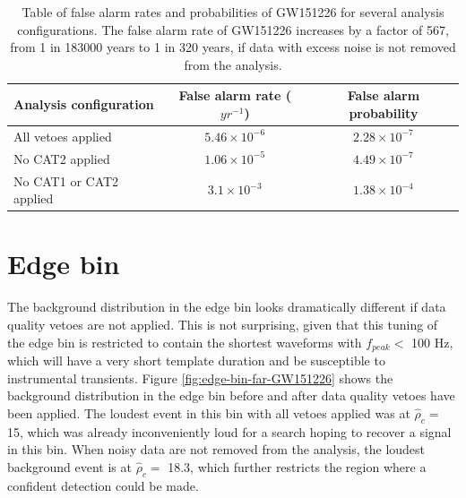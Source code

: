 \begin{table}[!ht]%
  \begin{center}
    \begin{tabular}{lcc}
      \hline
      Analysis configuration & False alarm rate ($yr^{-1}$) & False alarm probability \\ \hline
      All vetoes applied & $5.46\times10^{-6}$  & $2.28\times10^{-7}$ \\
      No CAT2 applied & $1.06\times10^{-5}$ & $4.49\times10^{-7}$ \\
      No CAT1 or CAT2 applied & $3.1\times10^{-3}$ & $1.38\times10^{-4}$ \\ \hline
    \end{tabular}
  \end{center}
  \caption[GW151226 FAR]{Table of false alarm rates and probabilities of GW151226 for several analysis %
           configurations. The false alarm rate of GW151226 increases by a factor %
           of 567, from 1 in 183000 years to 1 in 320 years, if data with excess noise %
           is not removed from the analysis.}
  \label{table:GW151226-far}
\end{table}

\section{Edge bin}

The background distribution in the edge bin looks dramatically different if data quality
vetoes are not applied. This is not surprising, given that this tuning of the edge bin
is restricted to contain the shortest waveforms with $f_{peak} <$ 100 Hz, which
will have a very short template duration and be susceptible to instrumental transients.
Figure \ref{fig:edge-bin-far-GW151226} shows the background distribution in the edge bin
before and after data quality vetoes have been applied.
The loudest event in this bin with all vetoes applied was at $\hat{\rho}_{c} =$ 15,
which was already inconveniently loud for a search hoping to recover a signal in this
bin. When noisy data are not removed from the analysis, the loudest background event is at
$\hat{\rho}_{c} =$ 18.3, which further restricts the region where a confident
detection could be made.

